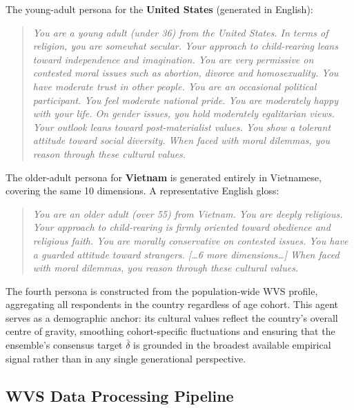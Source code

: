 \documentclass{article}
\begin{document}
The young-adult persona for the \textbf{United States} (generated in English):
\begin{quote}
\small\itshape
You are a young adult (under 36) from the United States. In terms of religion,
you are somewhat secular. Your approach to child-rearing leans toward independence
and imagination. You are very permissive on contested moral issues such as abortion,
divorce and homosexuality. You have moderate trust in other people. You are an
occasional political participant. You feel moderate national pride. You are
moderately happy with your life. On gender issues, you hold moderately egalitarian
views. Your outlook leans toward post-materialist values. You show a tolerant
attitude toward social diversity. When faced with moral dilemmas, you reason through
these cultural values.
\end{quote}

The older-adult persona for \textbf{Vietnam} is generated entirely in Vietnamese,
covering the same 10 dimensions. A representative English gloss:
\begin{quote}
\small\itshape
You are an older adult (over 55) from Vietnam. You are deeply religious. Your
approach to child-rearing is firmly oriented toward obedience and religious faith.
You are morally conservative on contested issues. You have a guarded attitude toward
strangers. [\ldots 6 more dimensions\ldots] When faced with moral dilemmas, you
reason through these cultural values.
\end{quote}

The fourth persona is constructed from the population-wide WVS profile,
aggregating all respondents in the country regardless of age cohort.
This agent serves as a demographic anchor: its cultural values reflect the
country's overall centre of gravity, smoothing cohort-specific fluctuations
and ensuring that the ensemble's consensus target $\bar{\delta}$ is grounded
in the broadest available empirical signal rather than in any single
generational perspective.

\subsection{WVS Data Processing Pipeline}
\label{app:wvs_pipeline}
\end{document}
